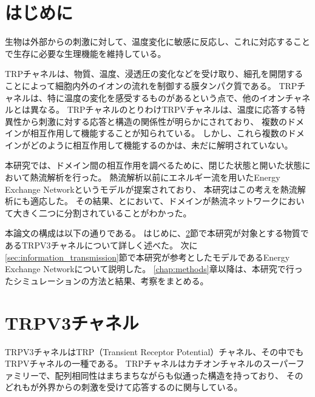 
%
%
%
%

\section{はじめに}

生物は外部からの刺激に対して、温度変化に敏感に反応し、これに対応することで生存に必要な生理機能を維持している。

TRPチャネルは、物質、温度、浸透圧の変化などを受け取り、細孔を開閉することによって細胞内外のイオンの流れを制御する膜タンパク質である。
TRPチャネルは、特に温度の変化を感受するものがあるという点で、他のイオンチャネルとは異なる。
TRPチャネルのとりわけTRPVチャネルは、温度に応答する特異性から刺激に対する応答と構造の関係性が明らかにされており、
複数のドメインが相互作用して機能することが知られている。
しかし、これら複数のドメインがどのように相互作用して機能するのかは、未だに解明されていない。

本研究では、ドメイン間の相互作用を調べるために、閉じた状態と開いた状態において熱流解析を行った。
熱流解析以前にエネルギー流を用いたEnergy Exchange Networkというモデルが提案されており、
本研究はこの考えを熱流解析にも適応した。
その結果、\openFortyTwo と\closeFortyTwo において、ドメインが熱流ネットワークにおいて大きく二つに分割されていることがわかった。


本論文の構成は以下の通りである。
はじめに、\ref{sec:trpv3}節で本研究が対象とする物質であるTRPV3チャネルについて詳しく述べた。
次に\ref{sec:information_transmission}節で本研究が参考としたモデルであるEnergy Exchange Networkについて説明した。
\ref{chap:methods}章以降は、本研究で行ったシミュレーションの方法と結果、考察をまとめる。

\newpage

\section{TRPV3チャネル}\label{sec:trpv3}
TRPV3チャネルはTRP（Transient Receptor Potential）チャネル、その中でもTRPVチャネルの一種である。
TRPチャネルはカチオンチャネルのスーパーファミリーで、配列相同性はまちまちながらも似通った構造を持っており、
そのどれもが外界からの刺激を受けて応答するのに関与している。\autocite{venkatachalam_trp_2007}


